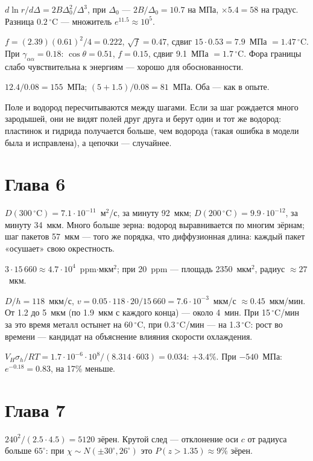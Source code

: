  $d\ln r/d\Delta=2B\Delta_0^2/\Delta^3$, при $\Delta_0$ --- $2B/\Delta_0=10.7$ на МПа, $\times5.4=58$
на градус. Разница $0.2\,^\circ$C --- множитель $e^{11.5}\approx10^5$.

 $f=(2.39)(0.61)^2/4=0.222$, $\sqrt f=0.47$, сдвиг $15\cdot0.53=7.9$~МПа $=1.47\,^\circ$C.
При $\gamma_{\alpha\alpha}=0.18$: $\cos\theta=0.51$, $f=0.15$, сдвиг 9.1~МПа $=1.7\,^\circ$C. Фора границы
слабо чувствительна к энергиям --- хорошо для обоснованности.

 $12.4/0.08=155$~МПа; $(5+1.5)/0.08=81$~МПа. Оба --- как в опыте.

 Поле и водород пересчитываются между шагами. Если за шаг рождается много зародышей, они
не видят полей друг друга и берут один и тот же водород: пластинок и гидрида получается больше,
чем водорода (такая ошибка в модели была и исправлена), а цепочки --- случайнее.

\section*{Глава 6}
 $D(300\,^\circ\text{C})=7.1\cdot10^{-11}$~м$^2$/с, за минуту 92~мкм; $D(200\,^\circ\text{C})=9.9\cdot10^{-12}$,
за минуту 34~мкм. Много больше зерна: водород выравнивается по многим зёрнам; шаг пакетов
57~мкм --- того же порядка, что диффузионная длина: каждый пакет «осушает» свою окрестность.

 $3\cdot15\,660\approx4.7\cdot10^4$~ppm$\cdot$мкм$^2$; при 20~ppm --- площадь 2350~мкм$^2$,
радиус $\approx27$~мкм.

 $D/h=118$~мкм/с, $v=0.05\cdot118\cdot20/15\,660=7.6\cdot10^{-3}$~мкм/с $\approx0.45$~мкм/мин.
От 1.2 до 5~мкм (по 1.9~мкм с каждого конца) --- около 4~мин. При 15\,$^\circ$C/мин за это время металл
остынет на 60\,$^\circ$C, при 0.3\,$^\circ$C/мин --- на 1.3\,$^\circ$C: рост во времени --- кандидат на
объяснение влияния скорости охлаждения.

 $V_H\sigma_h/RT=1.7\cdot10^{-6}\cdot10^8/(8.314\cdot603)=0.034$: $+3.4\%$. При $-540$~МПа:
$e^{-0.18}=0.83$, на 17\% меньше.

\section*{Глава 7}
 $240^2/(2.5\cdot4.5)=5120$ зёрен. Крутой след --- отклонение оси $c$ от радиуса больше
$65^\circ$: при $\chi\sim N(\pm30^\circ,26^\circ)$ это $P(z>1.35)\approx9\%$ зёрен.

